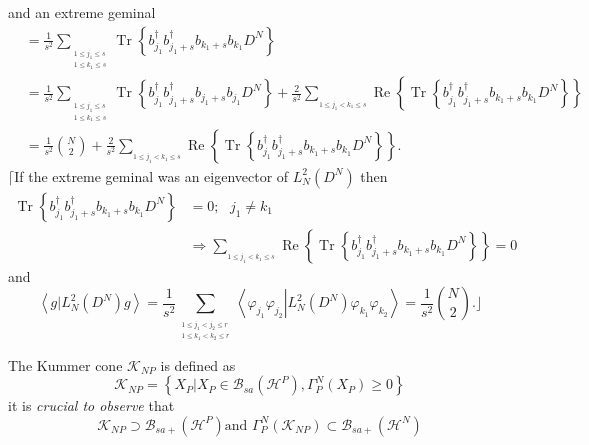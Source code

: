 \documentclass[aps,preprint]{revtex4}%
\begin{document}
and an extreme geminal
\begin{align}
&  =\frac{1}{s^{2}}\sum_{_{\substack{1\leq j_{1}\leq s\\1\leq k_{1}\leq s}%
}}\operatorname{Tr}\left\{  b_{j_{1}}^{\dagger}b_{j_{1}+s}^{\dagger}%
b_{k_{1}+s}b_{k_{1}}D^{N}\right\} \\
&  =\frac{1}{s^{2}}\sum_{_{\substack{1\leq j_{1}\leq s\\1\leq k_{1}\leq s}%
}}\operatorname{Tr}\left\{  b_{j_{1}}^{\dagger}b_{j_{1}+s}^{\dagger}%
b_{j_{1}+s}b_{j_{1}}D^{N}\right\}  +\frac{2}{s^{2}}\sum_{_{1\leq j_{1}%
<k_{1}\leq s}}\operatorname{Re}\left\{  \operatorname{Tr}\left\{  b_{j_{1}%
}^{\dagger}b_{j_{1}+s}^{\dagger}b_{k_{1}+s}b_{k_{1}}D^{N}\right\}  \right\} \\
&  =\frac{1}{s^{2}}\binom{N}{2}+\frac{2}{s^{2}}\sum_{_{1\leq j_{1}<k_{1}\leq
s}}\operatorname{Re}\left\{  \operatorname{Tr}\left\{  b_{j_{1}}^{\dagger
}b_{j_{1}+s}^{\dagger}b_{k_{1}+s}b_{k_{1}}D^{N}\right\}  \right\}  .
\end{align}
$\lceil$If the extreme geminal was an eigenvector of $L_{N}^{2}\left(
D^{N}\right)  $ then
\begin{align}
\operatorname{Tr}\left\{  b_{j_{1}}^{\dagger}b_{j_{1}+s}^{\dagger}b_{k_{1}%
+s}b_{k_{1}}D^{N}\right\}   &  =0;\text{ }j_{1}\neq k_{1}\nonumber\\
&  \Rightarrow\sum_{_{1\leq j_{1}<k_{1}\leq s}}\operatorname{Re}\left\{
\operatorname{Tr}\left\{  b_{j_{1}}^{\dagger}b_{j_{1}+s}^{\dagger}b_{k_{1}%
+s}b_{k_{1}}D^{N}\right\}  \right\}  =0
\end{align}
and
\begin{equation}
\left\langle \left.  g\right\vert L_{N}^{2}\left(  D^{N}\right)
g\right\rangle =\frac{1}{s^{2}}\sum_{_{\substack{1\leq j_{1}<j_{2}\leq
r\\1\leq k_{1}<k_{2}\leq r}}}\left\langle \left.  \varphi_{j_{1}}%
\varphi_{j_{2}}\right\vert L_{N}^{2}\left(  D^{N}\right)  \varphi_{k_{1}%
}\varphi_{k_{2}}\right\rangle =\frac{1}{s^{2}}\binom{N}{2}.\rfloor
\end{equation}


The Kummer cone $\mathcal{K}_{NP}$ is defined as
\begin{equation}
\mathcal{K}_{NP}=\left\{  \left.  X_{P}\right\vert X_{P}\in\mathcal{B}%
_{sa}\left(  \mathcal{H}^{P}\right)  ,\Gamma_{P}^{N}\left(  X_{P}\right)
\geq0\right\}
\end{equation}
it is \emph{crucial to observe} that
\begin{equation}
\mathcal{K}_{NP}\supset\mathcal{B}_{sa+}\left(  \mathcal{H}^{P}\right)  \text{
and }\Gamma_{P}^{N}\left(  \mathcal{K}_{NP}\right)  \subset\mathcal{B}%
_{sa+}\left(  \mathcal{H}^{N}\right)
\end{equation}
\end{document}
